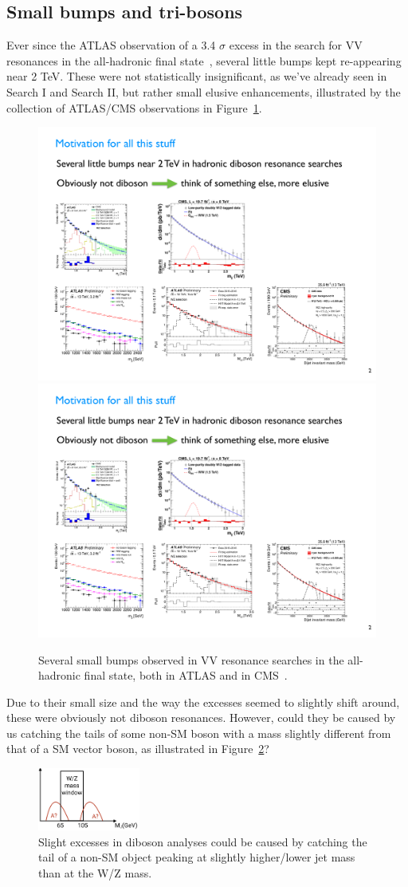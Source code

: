 \subsection{Small bumps and tri-bosons}
Ever since the ATLAS observation of a 3.4 $\sigma$ excess in the search for VV resonances in the all-hadronic final state~\cite{Aad2015}, several little bumps kept re-appearing near 2 TeV. These were not statistically insignificant, as we've already seen in Search I and Search II, but rather small elusive enhancements, illustrated by the collection of ATLAS/CMS observations in Figure~\ref{fig:searchIII:bumps}.
\begin{figure}[ht] 
    \centering
    \includegraphics[height=0.2\textwidth]{figures/analysis/search3/misc/bumps2.pdf}\\
    \includegraphics[height=0.2\textwidth]{figures/analysis/search3/misc/bumps1.pdf}\\
    \caption{Several small bumps observed in VV resonance searches in the all-hadronic final state, both in ATLAS and in CMS~\cite{stealth}.}
    \label{fig:searchIII:bumps}
\end{figure}
Due to their small size and the way the excesses seemed to slightly shift around, these were obviously not diboson resonances. However, could they be caused by us catching the tails of some non-SM boson with a mass slightly different from that of a SM vector boson, as illustrated in Figure~\ref{fig:searchIII:tails}?
\begin{figure}[ht] 
    \centering
    \includegraphics[width=0.3\textwidth]{figures/analysis/search3/misc/tails.png}
    \caption{Slight excesses in diboson analyses could be caused by catching the tail of a non-SM object peaking at slightly higher/lower jet mass than at the W/Z mass.}
    \label{fig:searchIII:tails}
\end{figure}
